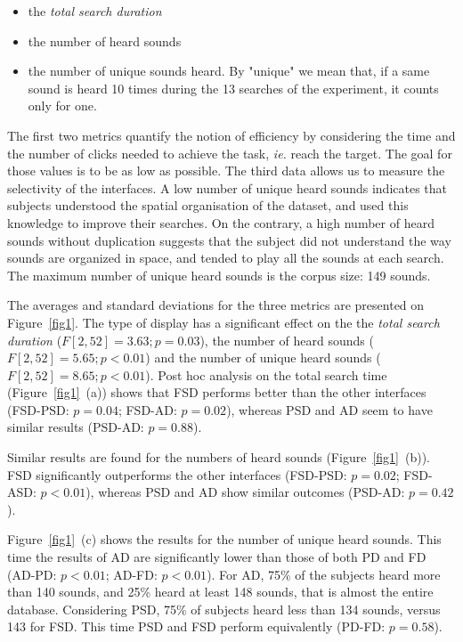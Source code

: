 \documentclass{aes2e}
\begin{document}
\begin{itemize}
\item the \textit{total search duration}
\item the number of heard sounds
\item the number of unique sounds heard. By "unique" we mean that, if a same sound is heard 10 times during the 13 searches of the  experiment, it counts only for one. 
\end{itemize}

The first two metrics quantify the notion of efficiency by considering the time and the number of clicks needed to achieve the task, \textit{ie.} reach the target. The goal for those values is to be as low as possible. The third data allows us to measure the selectivity of the interfaces. A low number of unique heard sounds indicates that subjects understood the spatial organisation of the dataset, and used this knowledge to improve their searches. On the contrary, a high number of heard sounds without duplication suggests that the subject did not understand the way sounds are organized in space, and tended to play all the sounds at each search. The maximum number of unique heard sounds is the corpus size: 149 sounds.

The averages and standard deviations for the three metrics are presented on Figure~\ref{fig1}. The type of display has a significant effect on the the \textit{total search duration} ($F[2,52]=3.63; p=0.03$), the number of heard sounds ($F[2,52]=5.65; p<0.01$) and the number of unique heard sounds ($F[2,52]=8.65; p<0.01$). Post hoc analysis on the total search time (Figure~\ref{fig1}~(a)) shows that FSD performs better than the other interfaces (FSD-PSD: $p=0.04$; FSD-AD: $p=0.02$), whereas PSD and AD seem to have similar results (PSD-AD: $p=0.88$).

Similar results are found for the numbers of heard sounds (Figure~\ref{fig1}~(b)). FSD significantly outperforms the other interfaces (FSD-PSD: $p=0.02$; FSD-ASD: $p<0.01$), whereas PSD and AD show similar outcomes (PSD-AD: $p=0.42$).

Figure~\ref{fig1}~(c) shows the results for the number of unique heard sounds. This time the results of AD are significantly lower than those of both PD and FD (AD-PD: $p<0.01$; AD-FD: $p<0.01$).  For AD, 75\% of the subjects heard more than 140 sounds, and 25\% heard at least 148 sounds, that is almost the entire database. Considering PSD, 75\% of subjects heard less than 134 sounds, versus 143 for FSD. This time PSD and FSD perform equivalently (PD-FD: $p=0.58$).
\end{document}
